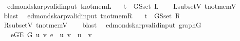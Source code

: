 \begin{isabellebody}
%
\isadelimproof
\isanewline
%
\endisadelimproof
%
\isadeliminvisible
\isanewline
%
\endisadeliminvisible
%
\isataginvisible
{}\isamarkupfalse%
\ {\isacharparenleft}{\kern0pt}\ edmonds{\isacharunderscore}{\kern0pt}karp{\isacharunderscore}{\kern0pt}valid{\isacharunderscore}{\kern0pt}input{\isacharparenright}{\kern0pt}\ t{\isacharunderscore}{\kern0pt}not{\isacharunderscore}{\kern0pt}mem{\isacharunderscore}{\kern0pt}L{\isacharcolon}{\kern0pt}\isanewline
\ \ \ {\isachardoublequoteopen}t\ {\isasymnotin}\ G{\isachardot}{\kern0pt}S{\isachardot}{\kern0pt}set\ L{\isachardoublequoteclose}%
\endisataginvisible
{\isafoldinvisible}%
%
\isadeliminvisible
\isanewline
%
\endisadeliminvisible
%
\isadelimproof
\ \ %
\endisadelimproof
%
\isatagproof
{}\isamarkupfalse%
\ L{\isacharunderscore}{\kern0pt}subset{\isacharunderscore}{\kern0pt}V\ t{\isacharunderscore}{\kern0pt}not{\isacharunderscore}{\kern0pt}mem{\isacharunderscore}{\kern0pt}V\isanewline
\ \ \isamarkupfalse%
\ blast%
\endisatagproof
{\isafoldproof}%
%
\isadelimproof
\isanewline
%
\endisadelimproof
%
\isadeliminvisible
\isanewline
%
\endisadeliminvisible
%
\isataginvisible
{}\isamarkupfalse%
\ {\isacharparenleft}{\kern0pt}\ edmonds{\isacharunderscore}{\kern0pt}karp{\isacharunderscore}{\kern0pt}valid{\isacharunderscore}{\kern0pt}input{\isacharparenright}{\kern0pt}\ t{\isacharunderscore}{\kern0pt}not{\isacharunderscore}{\kern0pt}mem{\isacharunderscore}{\kern0pt}R{\isacharcolon}{\kern0pt}\isanewline
\ \ \ {\isachardoublequoteopen}t\ {\isasymnotin}\ G{\isachardot}{\kern0pt}S{\isachardot}{\kern0pt}set\ R{\isachardoublequoteclose}%
\endisataginvisible
{\isafoldinvisible}%
%
\isadeliminvisible
\isanewline
%
\endisadeliminvisible
%
\isadelimproof
\ \ %
\endisadelimproof
%
\isatagproof
{}\isamarkupfalse%
\ R{\isacharunderscore}{\kern0pt}subset{\isacharunderscore}{\kern0pt}V\ t{\isacharunderscore}{\kern0pt}not{\isacharunderscore}{\kern0pt}mem{\isacharunderscore}{\kern0pt}V\isanewline
\ \ \isamarkupfalse%
\ blast%
\endisatagproof
{\isafoldproof}%
%
\isadelimproof
\isanewline
%
\endisadelimproof
%
\isadeliminvisible
\isanewline
%
\endisadeliminvisible
%
\isataginvisible
{}\isamarkupfalse%
\ {\isacharparenleft}{\kern0pt}\ edmonds{\isacharunderscore}{\kern0pt}karp{\isacharunderscore}{\kern0pt}valid{\isacharunderscore}{\kern0pt}input{\isacharparenright}{\kern0pt}\ graph{\isacharunderscore}{\kern0pt}G{\isacharcolon}{\kern0pt}\isanewline
\ \ \ {\isachardoublequoteopen}{\isasymforall}e{\isasymin}G{\isachardot}{\kern0pt}E\ G{\isachardot}{\kern0pt}\ {\isasymexists}u\ v{\isachardot}{\kern0pt}\ e\ {\isacharequal}{\kern0pt}\ {\isacharbraceleft}{\kern0pt}u{\isacharcomma}{\kern0pt}\ v{\isacharbraceright}{\kern0pt}\ {\isasymand}\ u\ {\isasymnoteq}\ v{\isachardoublequoteclose}%

\end{isabellebody}
